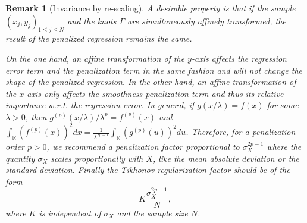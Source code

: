 \documentclass[a4paper]{article}
\newtheorem*{remark}{Remark}
\newcommand{\1}{\textbf{1}}
\newcommand{\R}{\mathbb{R}}
\begin{document}
\begin{remark}[Invariance by re-scaling]
A desirable property is that if the sample $(x_j, y_j)_{1 \leq j \leq N}$ and the knots $\Gamma$ are simultaneously affinely transformed, the result of the penalized regression remains the same. 
\par On the one hand, an affine transformation of the $y$-axis affects the regression error term and the penalization term in the same fashion and will not change the shape of the penalized regression. In the other hand, an affine transformation of the $x$-axis only affects the smoothness penalization term and thus its relative importance w.r.t. the regression error. In general, if $g(x / \lambda ) = f(x)$ for some $\lambda >0$, then $g^{(p)}(x/\lambda)/\lambda^p = f^{(p)}(x)$ and $\int_\R \left(f^{(p)}(x)\right)^2 dx = \frac{1}{\lambda^{2 p - 1}} \int_\R \left(g^{(p)}(u)\right)^2 du$. Therefore, for a penalization order $p>0$, we recommend a penalization factor proportional to $\sigma_X^{2p-1}$ where the quantity $\sigma_X$ scales proportionally with $X$, like the mean absolute deviation or the standard deviation. Finally the Tikhonov regularization factor should be of the form
\begin{equation}\label{eq:final_penalization_factor}
K \frac{\sigma_X^{2p-1}}{N},
\end{equation}
where $K$ is independent of $\sigma_X$ and the sample size $N$. 
\end{remark}
\end{document}
